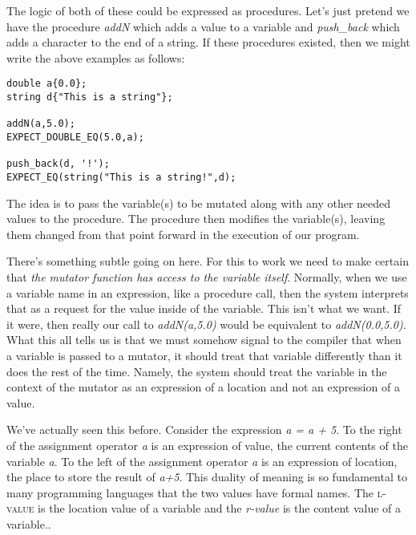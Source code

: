 \documentclass[]{tufte-handout}
\begin{document}
The logic of both of these could be expressed as procedures.  Let's just pretend we have the procedure \textit{addN} which adds a value to a variable and \textit{push\_back} which adds a character to the end of a string. If these procedures existed, then we might write the above examples as follows:
\begin{verbatim}
double a{0.0};
string d{"This is a string"};

addN(a,5.0);
EXPECT_DOUBLE_EQ(5.0,a);

push_back(d, '!');
EXPECT_EQ(string("This is a string!",d);
\end{verbatim}
The idea is to pass the variable(s) to be mutated along with any other needed values to the procedure. The procedure then modifies the variable(s), leaving them changed from that point forward in the execution of our program. 

There's something subtle going on here. For this to work we need to make certain that \textit{the mutator function has access to the variable itself}.  Normally, when we use a variable name in an expression, like a procedure call, then the system interprets that as a request for the value inside of the variable. This isn't what we want. If it were, then really our call to \textit{addN(a,5.0)} would be equivalent to \textit{addN(0.0,5.0)}. What this all tells us is that we must somehow signal to the compiler that when a variable is passed to a mutator, it should treat that variable differently than it does the rest of the time. Namely, the system should treat the variable in the context of the mutator as an expression of a location and not an expression of a value.

We've actually seen this before.  Consider the expression \textit{a = a + 5}.  To the right of the assignment operator \textit{a} is an expression of value, the current contents of the variable \textit{a}.  To the left of the assignment operator \textit{a} is an expression of location, the place to store the result of \textit{a+5}.  This duality of meaning is so fundamental to many programming languages that the two values have formal names. The \textsc{l-value} is the location value of a variable and the \textit{r-value} is the content value of a variable.. 
\end{document}
